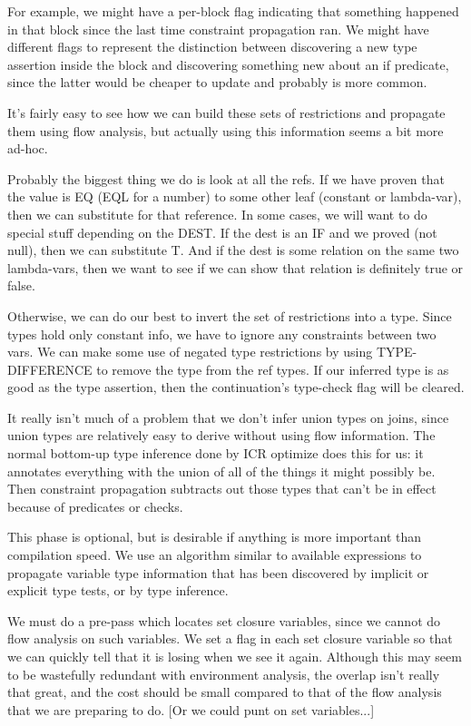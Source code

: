 For example, we might have a per-block flag indicating that something happened
in that block since the last time constraint propagation ran.  We might have
different flags to represent the distinction between discovering a new type
assertion inside the block and discovering something new about an if
predicate, since the latter would be cheaper to update and probably is more
common.

It's fairly easy to see how we can build these sets of restrictions and
propagate them using flow analysis, but actually using this information seems
a bit more ad-hoc.  

Probably the biggest thing we do is look at all the refs.  If we have proven that
the value is EQ (EQL for a number) to some other leaf (constant or lambda-var),
then we can substitute for that reference.  In some cases, we will want to do
special stuff depending on the DEST.  If the dest is an IF and we proved (not
null), then we can substitute T.  And if the dest is some relation on the same
two lambda-vars, then we want to see if we can show that relation is definitely
true or false.

Otherwise, we can do our best to invert the set of restrictions into a type.
Since types hold only constant info, we have to ignore any constraints between
two vars.  We can make some use of negated type restrictions by using
TYPE-DIFFERENCE to remove the type from the ref types.  If our inferred type is
as good as the type assertion, then the continuation's type-check flag will be
cleared.

It really isn't much of a problem that we don't infer union types on joins,
since union types are relatively easy to derive without using flow information.
The normal bottom-up type inference done by ICR optimize does this for us: it
annotates everything with the union of all of the things it might possibly be.
Then constraint propagation subtracts out those types that can't be in effect
because of predicates or checks.



This phase is optional, but is desirable if anything is more important than
compilation speed.  We use an algorithm similar to available expressions to
propagate variable type information that has been discovered by implicit or
explicit type tests, or by type inference.

We must do a pre-pass which locates set closure variables, since we cannot do
flow analysis on such variables.  We set a flag in each set closure variable so
that we can quickly tell that it is losing when we see it again.  Although this
may seem to be wastefully redundant with environment analysis, the overlap
isn't really that great, and the cost should be small compared to that of the
flow analysis that we are preparing to do.  [Or we could punt on set
variables...]

